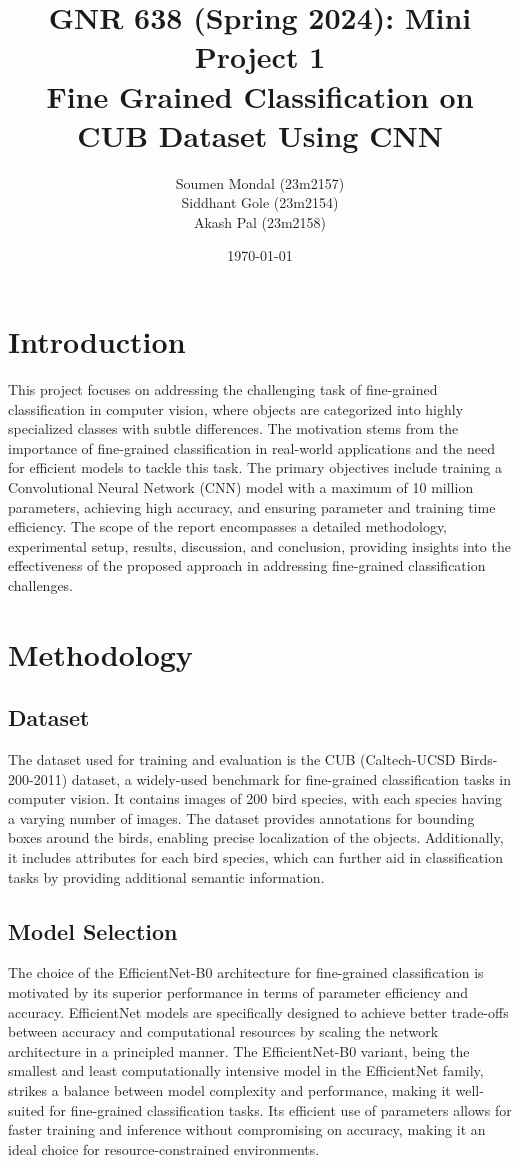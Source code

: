 \documentclass[12pt, a4paper, twoside]{article}
\title{\vspace{-0.5in}\textbf{GNR 638 (Spring 2024): Mini Project 1\\{\large Fine Grained Classification on CUB Dataset Using CNN}}}
\author{Soumen Mondal (23m2157)\\Siddhant Gole (23m2154)\\Akash Pal (23m2158)}
\date{\today}
\begin{document}
	\maketitle
	\thispagestyle{fancy}
	
	\section{Introduction}
	
		This project focuses on addressing the challenging task of fine-grained classification in computer vision, where objects are categorized into highly specialized classes with subtle differences. The motivation stems from the importance of fine-grained classification in real-world applications and the need for efficient models to tackle this task. The primary objectives include training a Convolutional Neural Network (CNN) model with a maximum of 10 million parameters, achieving high accuracy, and ensuring parameter and training time efficiency. The scope of the report encompasses a detailed methodology, experimental setup, results, discussion, and conclusion, providing insights into the effectiveness of the proposed approach in addressing fine-grained classification challenges.
		
		
	\section{Methodology}
	
		\subsection{Dataset}
			
			The dataset used for training and evaluation is the CUB (Caltech-UCSD Birds-200-2011) dataset, a widely-used benchmark for fine-grained classification tasks in computer vision. It contains images of 200 bird species, with each species having a varying number of images. The dataset provides annotations for bounding boxes around the birds, enabling precise localization of the objects. Additionally, it includes attributes for each bird species, which can further aid in classification tasks by providing additional semantic information.
		
		\subsection{Model Selection}
		
			The choice of the EfficientNet-B0 architecture for fine-grained classification is motivated by its superior performance in terms of parameter efficiency and accuracy. EfficientNet models are specifically designed to achieve better trade-offs between accuracy and computational resources by scaling the network architecture in a principled manner. The EfficientNet-B0 variant, being the smallest and least computationally intensive model in the EfficientNet family, strikes a balance between model complexity and performance, making it well-suited for fine-grained classification tasks. Its efficient use of parameters allows for faster training and inference without compromising on accuracy, making it an ideal choice for resource-constrained environments.
			
\end{document}
